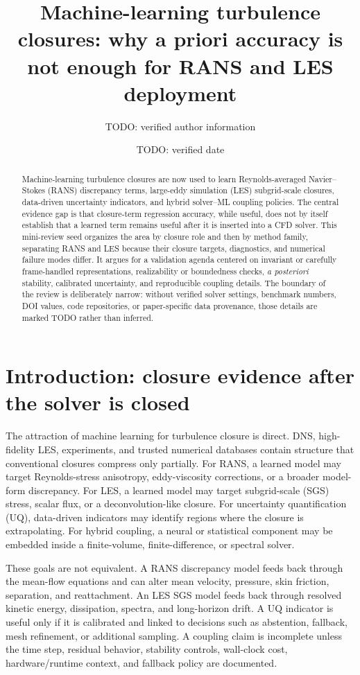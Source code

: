 \documentclass[11pt]{article}
\title{Machine-learning turbulence closures: why a priori accuracy is not enough for RANS and LES deployment}
\author{TODO: verified author information}
\date{TODO: verified date}
\newcommand{\aposteriori}{\textit{a posteriori}}
\begin{document}
\maketitle

\begin{abstract}
Machine-learning turbulence closures are now used to learn Reynolds-averaged Navier--Stokes (RANS) discrepancy terms, large-eddy simulation (LES) subgrid-scale closures, data-driven uncertainty indicators, and hybrid solver--ML coupling policies. The central evidence gap is that closure-term regression accuracy, while useful, does not by itself establish that a learned term remains useful after it is inserted into a CFD solver. This mini-review seed organizes the area by closure role and then by method family, separating RANS and LES because their closure targets, diagnostics, and numerical failure modes differ. It argues for a validation agenda centered on invariant or carefully frame-handled representations, realizability or boundedness checks, \aposteriori{} stability, calibrated uncertainty, and reproducible coupling details. The boundary of the review is deliberately narrow: without verified solver settings, benchmark numbers, DOI values, code repositories, or paper-specific data provenance, those details are marked TODO rather than inferred.
\end{abstract}

\section{Introduction: closure evidence after the solver is closed}

The attraction of machine learning for turbulence closure is direct. DNS, high-fidelity LES, experiments, and trusted numerical databases contain structure that conventional closures compress only partially. For RANS, a learned model may target Reynolds-stress anisotropy, eddy-viscosity corrections, or a broader model-form discrepancy. For LES, a learned model may target subgrid-scale (SGS) stress, scalar flux, or a deconvolution-like closure. For uncertainty quantification (UQ), data-driven indicators may identify regions where the closure is extrapolating. For hybrid coupling, a neural or statistical component may be embedded inside a finite-volume, finite-difference, or spectral solver.

These goals are not equivalent. A RANS discrepancy model feeds back through the mean-flow equations and can alter mean velocity, pressure, skin friction, separation, and reattachment. An LES SGS model feeds back through resolved kinetic energy, dissipation, spectra, and long-horizon drift. A UQ indicator is useful only if it is calibrated and linked to decisions such as abstention, fallback, mesh refinement, or additional sampling. A coupling claim is incomplete unless the time step, residual behavior, stability controls, wall-clock cost, hardware/runtime context, and fallback policy are documented.
\end{document}
